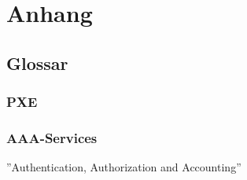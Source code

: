 \chapter{Anhang}
\section{Glossar}

\subsection{PXE}

\subsection{AAA-Services}
''Authentication, Authorization and Accounting''